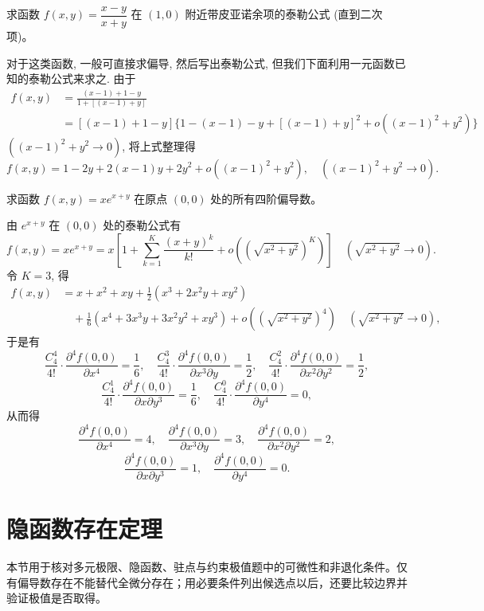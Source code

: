 \documentclass[UTF8,12pt,a4paper,fontset=fandol]{ctexart}
\begin{document}
\begin{example}\label{course-example-14-3-1}\quad 求函数 $f(x,y)=\dfrac{x-y}{x+y}$ 在 $(1,0)$ 附近带皮亚诺余项的泰勒公式 (直到二次项)。

\end{example}
\begin{solve}\quad 对于这类函数, 一般可直接求偏导, 然后写出泰勒公式, 但我们下面利用一元函数已知的泰勒公式来求之. 由于
\[
\begin{aligned}
  f(x,y)
  &=\frac{(x-1)+1-y}{1+[(x-1)+y]}\\
  &=[(x-1)+1-y]\{1-(x-1)-y+[(x-1)+y]^2
  +o((x-1)^2+y^2)\}
\end{aligned}
\]
$((x-1)^2+y^2\to0)$, 将上式整理得
\[
  f(x,y)=1-2y+2(x-1)y+2y^2+o((x-1)^2+y^2),
  \quad ((x-1)^2+y^2\to0).
\]

\end{solve}
\begin{example}\label{course-example-14-3-2}\quad 求函数 $f(x,y)=xe^{x+y}$ 在原点 $(0,0)$ 处的所有四阶偏导数。

\end{example}
\begin{solve}\quad 由 $e^{x+y}$ 在 $(0,0)$ 处的泰勒公式有
\[
  f(x,y)=xe^{x+y}
  =x\left[1+\sum_{k=1}^K\frac{(x+y)^k}{k!}
  +o\left((\sqrt{x^2+y^2})^K\right)\right]
  \quad(\sqrt{x^2+y^2}\to0).
\]
令 $K=3$, 得
\[
\begin{aligned}
  f(x,y)
  &=x+x^2+xy+\frac12(x^3+2x^2y+xy^2)\\
  &\quad+\frac16(x^4+3x^3y+3x^2y^2+xy^3)
  +o\left((\sqrt{x^2+y^2})^4\right)
  \quad(\sqrt{x^2+y^2}\to0),
\end{aligned}
\]
于是有
\[
  \frac{C_4^4}{4!}\cdot\frac{\partial^4 f(0,0)}{\partial x^4}=\frac16,\quad
  \frac{C_4^3}{4!}\cdot\frac{\partial^4 f(0,0)}{\partial x^3\partial y}=\frac12,\quad
  \frac{C_4^2}{4!}\cdot\frac{\partial^4 f(0,0)}{\partial x^2\partial y^2}=\frac12,
\]
\[
  \frac{C_4^1}{4!}\cdot\frac{\partial^4 f(0,0)}{\partial x\partial y^3}=\frac16,\quad
  \frac{C_4^0}{4!}\cdot\frac{\partial^4 f(0,0)}{\partial y^4}=0,
\]
从而得
\[
  \frac{\partial^4 f(0,0)}{\partial x^4}=4,\quad
  \frac{\partial^4 f(0,0)}{\partial x^3\partial y}=3,\quad
  \frac{\partial^4 f(0,0)}{\partial x^2\partial y^2}=2,
\]
\[
  \frac{\partial^4 f(0,0)}{\partial x\partial y^3}=1,\quad
  \frac{\partial^4 f(0,0)}{\partial y^4}=0.
\]

\end{solve}


\section{隐函数存在定理}\label{course-14-4}
本节用于核对多元极限、隐函数、驻点与约束极值题中的可微性和非退化条件。仅有偏导数存在不能替代全微分存在；用必要条件列出候选点以后，还要比较边界并验证极值是否取得。
\end{document}

